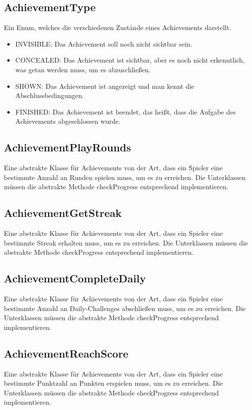 \documentclass[a4paper]{scrreprt}
\begin{document}
    \subsection{AchievementType}
    Ein Enum, welches die verschiedenen Zustände eines Achievements darstellt.

    \begin{itemize}
        \item INVISIBLE: Das Achievement soll noch nicht sichtbar sein.
        \item CONCEALED: Das Achievement ist sichtbar, aber es noch nicht erkenntlich, was getan werden muss, um es abzuschließen.
        \item SHOWN: Das Achievement ist angezeigt und man kennt die Abschlussbedingungen.
        \item FINISHED: Das Achievement ist beendet, das heißt, dass die Aufgabe des Achievements abgeschlossen wurde.
    \end{itemize}

    \subsection{AchievementPlayRounds}
    Eine abstrakte Klasse für Achievements von der Art, dass ein Spieler eine bestimmte Anzahl an Runden spielen muss, um es zu erreichen. Die Unterklassen müssen die abstrakte Methode checkProgress entsprechend implementieren.

    \subsection{AchievementGetStreak}
    Eine abstrakte Klasse für Achievements von der Art, dass ein Spieler eine bestimmte Streak erhalten muss, um es zu erreichen. Die Unterklassen müssen die abstrakte Methode checkProgress entsprechend implementieren.

    \subsection{AchievementCompleteDaily}
    Eine abstrakte Klasse für Achievements von der Art, dass ein Spieler eine bestimmte Anzahl an Daily-Challenges abschließen muss, um es zu erreichen. Die Unterklassen müssen die abstrakte Methode checkProgress entsprechend implementieren.

    \subsection{AchievementReachScore}
    Eine abstrakte Klasse für Achievements von der Art, dass ein Spieler eine bestimmte Punktzahl an Punkten erspielen muss, um es zu erreichen. Die Unterklassen müssen die abstrakte Methode checkProgress entsprechend implementieren.
\end{document}
